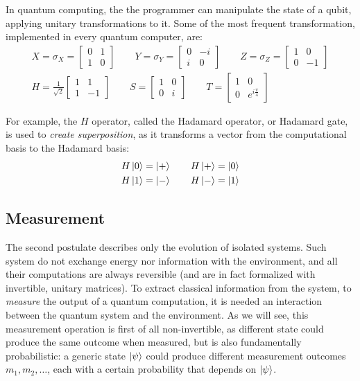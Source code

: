 \documentclass[10pt,a4paper, titlepage]{report}
\theoremstyle{definition}
\newcommand{\kp}{\ket{\psi}}
\newcommand{\kz}{\ket{0}}
\newcommand{\ko}{\ket{1}}
\newcommand{\kpl}{\ket{+}}
\newcommand{\oost}{\frac{1}{\sqrt{2}}}
\newcommand{\km}{\ket{-}}
\begin{document}
In quantum computing, the the programmer can manipulate the state of a qubit, applying unitary transformations to it. Some of the most frequent transformation, implemented in every quantum computer, are:
\begin{gather*}
	X = \sigma_X = \begin{bmatrix}
	0 & 1 \\
	1 & 0
	\end{bmatrix} \qquad
	Y = \sigma_Y = \begin{bmatrix}
	0 & -i \\
	i & 0
	\end{bmatrix} \qquad
	Z = \sigma_Z = \begin{bmatrix}
	1 & 0 \\
	0 & -1
	\end{bmatrix} \\ 
	H = \oost\begin{bmatrix}
	1 & 1 \\
	1 & -1
	\end{bmatrix} \qquad
 	S = \begin{bmatrix}
	1 & 0 \\
	0 & i
	\end{bmatrix}\qquad
	T = \begin{bmatrix}
	1 & 0 \\
	0 & e^{i\frac{\pi}{4}}
	\end{bmatrix} 
\end{gather*}

For example, the $H$ operator, called the Hadamard operator, or Hadamard gate, is used to \textit{create superposition}, as it transforms a vector from the computational basis to the Hadamard basis:
\begin{gather*}
	H\kz = \kpl \qquad H\kpl = \kz  \\
	H\ko = \km \qquad H\km = \ko \\	 
\end{gather*}
\subsection{Measurement}

The second postulate describes only the evolution of isolated systems. Such system do not exchange energy nor information with the environment, and all their computations are always reversible (and are in fact formalized with invertible, unitary matrices). To extract classical information from the system, to \textit{measure} the output of a quantum computation, it is needed an interaction between the quantum system and the environment. As we will see, this measurement operation is first of all non-invertible, as different state could produce the same outcome when measured, but is also fundamentally probabilistic: a generic state $\kp$ could produce different measurement outcomes $m_1, m_2,\ldots$, each with a certain probability that depends on $\kp$.
\end{document}
